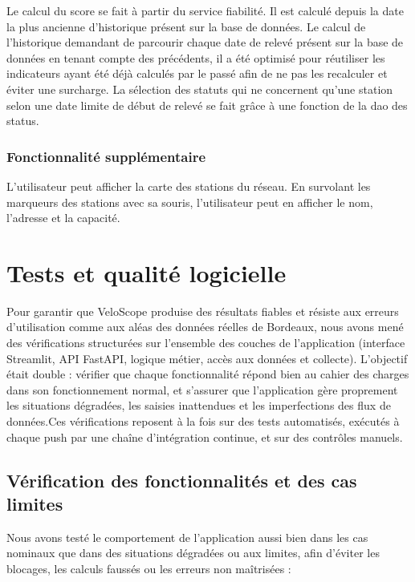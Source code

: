 \documentclass[
  french,
  11pt,
  a4paper,
]{article}
\begin{document}
Le calcul du score se fait à partir du service fiabilité. Il est calculé
depuis la date la plus ancienne d'historique présent sur la base de
données. Le calcul de l'historique demandant de parcourir chaque date de
relevé présent sur la base de données en tenant compte des précédents,
il a été optimisé pour réutiliser les indicateurs ayant été déjà
calculés par le passé afin de ne pas les recalculer et éviter une
surcharge. La sélection des statuts qui ne concernent qu'une station
selon une date limite de début de relevé se fait grâce à une fonction de
la dao des status.

\subsubsection{Fonctionnalité
supplémentaire}\label{fonctionnalituxe9-suppluxe9mentaire}

L'utilisateur peut afficher la carte des stations du réseau. En
survolant les marqueurs des stations avec sa souris, l'utilisateur peut
en afficher le nom, l'adresse et la capacité.

\pagebreak

\section{Tests et qualité
logicielle}\label{tests-et-qualituxe9-logicielle}

Pour garantir que VeloScope produise des résultats fiables et résiste
aux erreurs d'utilisation comme aux aléas des données réelles de
Bordeaux, nous avons mené des vérifications structurées sur l'ensemble
des couches de l'application (interface Streamlit, API FastAPI, logique
métier, accès aux données et collecte). L'objectif était double :
vérifier que chaque fonctionnalité répond bien au cahier des charges
dans son fonctionnement normal, et s'assurer que l'application gère
proprement les situations dégradées, les saisies inattendues et les
imperfections des flux de données.Ces vérifications reposent à la fois
sur des tests automatisés, exécutés à chaque push par une chaîne
d'intégration continue, et sur des contrôles manuels.

\subsection{Vérification des fonctionnalités et des cas
limites}\label{vuxe9rification-des-fonctionnalituxe9s-et-des-cas-limites}

Nous avons testé le comportement de l'application aussi bien dans les
cas nominaux que dans des situations dégradées ou aux limites, afin
d'éviter les blocages, les calculs faussés ou les erreurs non maîtrisées
:
\end{document}
